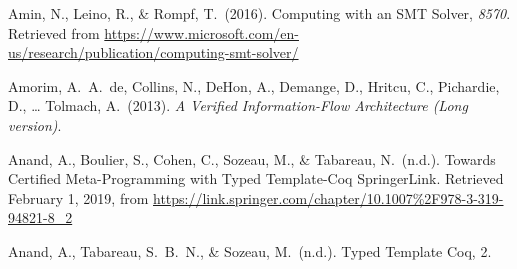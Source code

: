 \documentclass[12pt,twoside]{article}
\begin{document}
{\begin{thebibliography}{222}
Amin, N., Leino, R., \& Rompf, T.~(2016). Computing with an SMT Solver, \emph{8570}. Retrieved from \href{https://www.microsoft.com/en-us/research/publication/computing-smt-solver/}{{\ttfamily https://\hspace{0pt}www.\hspace{0pt}microsoft.\hspace{0pt}com/\hspace{0pt}en-\hspace{0pt}us/\hspace{0pt}research/\hspace{0pt}publication/\hspace{0pt}computing-\hspace{0pt}smt-\hspace{0pt}solver/\hspace{0pt}}}\label{amin_computing_2016}%

\mdbibitemlabel{[Amorim et al., 2013]}Amorim, A.~A.~de, Collins, N., DeHon, A., Demange, D., Hritcu, C., Pichardie, D., … Tolmach, A.~(2013). \emph{A Verified Information-Flow Architecture (Long version)}.\label{amorim_verified_2013}%

Anand, A., Boulier, S., Cohen, C., Sozeau, M., \& Tabareau, N.~(n.d.). Towards Certified Meta-Programming with Typed Template-Coq \textbar{} SpringerLink. Retrieved February 1, 2019, from \href{https://link.springer.com/chapter/10.1007\%252F978-3-319-94821-8_2}{{\ttfamily https://\hspace{0pt}link.\hspace{0pt}springer.\hspace{0pt}com/\hspace{0pt}chapter/\hspace{0pt}10.\hspace{0pt}1007\hspace{0pt}\%2F978-\hspace{0pt}3-\hspace{0pt}319-\hspace{0pt}94821-\hspace{0pt}8\_\hspace{0pt}2}}\label{anand_towards_nodate}%

Anand, A., Tabareau, S.~B.~N., \& Sozeau, M.~(n.d.). Typed Template Coq, 2.\label{anand_typed_nodate}%


\end{thebibliography}}
\end{document}
